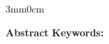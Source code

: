 

\thispagestyle{backcover}

\begin{changemargin}{3mm}{0cm}
    \begin{minipage}[c]{0.96\columnwidth}

        {\LARGE\textbf{Abstract}}
        \vskip1mm
        \begingroup
            \large
            \@englishAbstract
        \endgroup
        \vskip1mm
        {\textbf{Keywords: }
            \begingroup
                \@englishAbstractKeywords
            \endgroup
        }
    \end{minipage}
\end{changemargin}